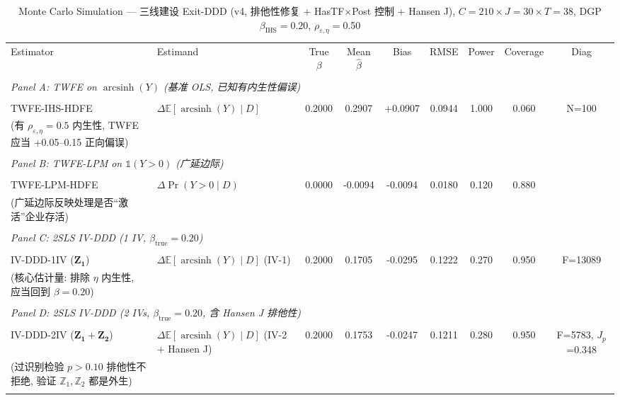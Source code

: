 \begin{table}[htbp]
\centering
\small
\caption{Monte Carlo Simulation --- 三线建设 Exit-DDD (v4, 排他性修复 + HasTF$\times$Post 控制 + Hansen J), $C=210 \times J=30 \times T=38$, DGP $\beta_{\text{IHS}}=0.20$, $\rho_{\varepsilon,\eta}=$0.50}
\label{tab:mc_sim_v4}
\begin{tabular}{l l c c c c c c c}
\toprule
Estimator & Estimand & True $\beta$ & Mean $\hat\beta$ & Bias & RMSE & Power & Coverage & Diag \\\\
\midrule
\multicolumn{9}{l}{\textit{Panel A: TWFE on $\operatorname{arcsinh}(Y)$ (基准 OLS, 已知有内生性偏误)}} \\\\
TWFE-IHS-HDFE & $\Delta \mathbb{E}[\operatorname{arcsinh}(Y) \mid D]$ & 0.2000 & 0.2907 & +0.0907 & 0.0944 & 1.000 & 0.060 & N=100 \\
\quad (有 $\rho_{\varepsilon,\eta}=0.5$ 内生性, TWFE 应当 +0.05--0.15 正向偏误) & & & & & & & & \\\\
\multicolumn{9}{l}{\textit{Panel B: TWFE-LPM on $\mathbb{1}(Y>0)$ (广延边际)}} \\\\
TWFE-LPM-HDFE & $\Delta \Pr(Y>0 \mid D)$ & 0.0000 & -0.0094 & -0.0094 & 0.0180 & 0.120 & 0.880 & \\
\quad (广延边际反映处理是否``激活''企业存活) & & & & & & & & \\\\
\multicolumn{9}{l}{\textit{Panel C: 2SLS IV-DDD (1 IV, $\beta_{\text{true}}=0.20$)}} \\\\
IV-DDD-1IV ($\mathbf{Z_1}$) & $\Delta \mathbb{E}[\operatorname{arcsinh}(Y) \mid D]$ (IV-1) & 0.2000 & 0.1705 & -0.0295 & 0.1222 & 0.270 & 0.950 & F=13089 \\
\quad ($\mathbf{核心估计量}$: 排除 $\eta$ 内生性, 应当回到 $\beta=0.20$) & & & & & & & & \\\\
\multicolumn{9}{l}{\textit{Panel D: 2SLS IV-DDD (2 IVs, $\beta_{\text{true}}=0.20$, 含 Hansen J 排他性)}} \\\\
IV-DDD-2IV ($\mathbf{Z_1+Z_2}$) & $\Delta \mathbb{E}[\operatorname{arcsinh}(Y) \mid D]$ (IV-2 + Hansen J) & 0.2000 & 0.1753 & -0.0247 & 0.1211 & 0.280 & 0.950 & F=5783, $J_p$=0.348 \\
\quad (过识别检验 $p>0.10$ 排他性不拒绝, 验证 $\mathbb{Z}_1, \mathbb{Z}_2$ 都是外生) & & & & & & & & \\\\

\end{tabular}
\end{table}
